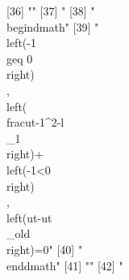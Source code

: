 [36] ""                                                                                                                                                                                                                                                                                              
[37] "%
[38] "\\begin{dmath}"                                                                                                                                                                                                                                                                                
[39] "\\left(-1\\geq 0\\right)\\, \\left(\\frac{{ut}}{-1^{2}}-{{l\\_1}}\\right)+\\left(-1<0\\right)\\, \\left({ut}-{{ut\\_old}}\\right)=0"                                                                                                                                                           
[40] "\\end{dmath}"                                                                                                                                                                                                                                                                                  
[41] ""                                                                                                                                                                                                                                                                                              
[42] "%
